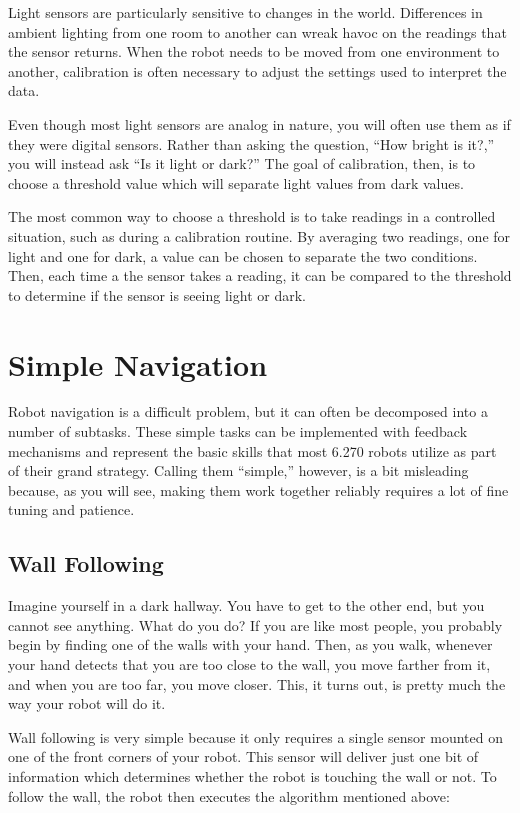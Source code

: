 Light sensors are particularly sensitive to changes in the
world. Differences in ambient lighting from one room to another can
wreak havoc on the readings that the sensor returns. When the robot
needs to be moved from one environment to another, calibration is
often necessary to adjust the settings used to interpret the data.

Even though most light sensors are analog in nature, you will often
use them as if they were digital sensors. Rather than asking the
question, ``How bright is it?,'' you will instead ask ``Is it light or
dark?'' The goal of calibration, then, is to choose a threshold value
which will separate light values from dark values.

The most common way to choose a threshold is to take readings in a
controlled situation, such as during a calibration routine. By
averaging two readings, one for light and one for dark, a value can be
chosen to separate the two conditions. Then, each time a the sensor
takes a reading, it can be compared to the threshold to determine if
the sensor is seeing light or dark.

\section{Simple Navigation}

Robot navigation is a difficult problem, but it can often be
decomposed into a number of subtasks.  These simple tasks can be
implemented with feedback mechanisms and represent the basic skills
that most 6.270 robots utilize as part of their grand
strategy. Calling them ``simple,'' however, is a bit misleading
because, as you will see, making them work together reliably requires
a lot of fine tuning and patience.

\subsection{Wall Following}

Imagine yourself in a dark hallway.  You have to get to the other end,
but you cannot see anything.  What do you do? If you are like most
people, you probably begin by finding one of the walls with your
hand. Then, as you walk, whenever your hand detects that you are too
close to the wall, you move farther from it, and when you are too far,
you move closer.  This, it turns out, is pretty much the way your
robot will do it.

Wall following is very simple because it only requires a single sensor
mounted on one of the front corners of your robot. This sensor will
deliver just one bit of information which determines whether the robot
is touching the wall or not.  To follow the wall, the robot then
executes the algorithm mentioned above:

